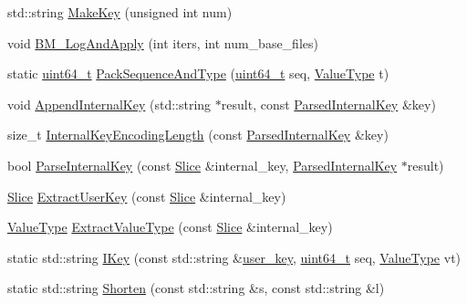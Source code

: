 \begin{DoxyCompactItemize}
std\-::string \hyperlink{namespaceleveldb_a706c78e756ff2dcd2185cdf2265c0b8a}{Make\-Key} (unsigned int num)
\item 
void \hyperlink{namespaceleveldb_af9cf6ec167c9b6f25fd050ab6fb67a90}{B\-M\-\_\-\-Log\-And\-Apply} (int iters, int num\-\_\-base\-\_\-files)
\item 
static \hyperlink{stdint_8h_aaa5d1cd013383c889537491c3cfd9aad}{uint64\-\_\-t} \hyperlink{namespaceleveldb_aefa1c5ac4d405fe1077c19fa2fe68647}{Pack\-Sequence\-And\-Type} (\hyperlink{stdint_8h_aaa5d1cd013383c889537491c3cfd9aad}{uint64\-\_\-t} seq, \hyperlink{namespaceleveldb_acc038cb0d608414730cafa459a4ba866}{Value\-Type} t)
\item 
void \hyperlink{namespaceleveldb_a7192bb79e7fa6ba01490473941386534}{Append\-Internal\-Key} (std\-::string $\ast$result, const \hyperlink{structleveldb_1_1_parsed_internal_key}{Parsed\-Internal\-Key} \&key)
\item 
size\-\_\-t \hyperlink{namespaceleveldb_a8406e76939e7e97465acf293f1585581}{Internal\-Key\-Encoding\-Length} (const \hyperlink{structleveldb_1_1_parsed_internal_key}{Parsed\-Internal\-Key} \&key)
\item 
bool \hyperlink{namespaceleveldb_a5a173b622e86c7a2f9beae3ac8818ac3}{Parse\-Internal\-Key} (const \hyperlink{classleveldb_1_1_slice}{Slice} \&internal\-\_\-key, \hyperlink{structleveldb_1_1_parsed_internal_key}{Parsed\-Internal\-Key} $\ast$result)
\item 
\hyperlink{classleveldb_1_1_slice}{Slice} \hyperlink{namespaceleveldb_a1c889869840312393b805ad91a41b94f}{Extract\-User\-Key} (const \hyperlink{classleveldb_1_1_slice}{Slice} \&internal\-\_\-key)
\item 
\hyperlink{namespaceleveldb_acc038cb0d608414730cafa459a4ba866}{Value\-Type} \hyperlink{namespaceleveldb_a0c5a6ea40d7c0e87060a6e6d3ee393ec}{Extract\-Value\-Type} (const \hyperlink{classleveldb_1_1_slice}{Slice} \&internal\-\_\-key)
\item 
static std\-::string \hyperlink{namespaceleveldb_a129ecd3bf532c7422038a47c86f00826}{I\-Key} (const std\-::string \&\hyperlink{version__set_8cc_afced2118ae0bf03db7c7e75a21cfd004}{user\-\_\-key}, \hyperlink{stdint_8h_aaa5d1cd013383c889537491c3cfd9aad}{uint64\-\_\-t} seq, \hyperlink{namespaceleveldb_acc038cb0d608414730cafa459a4ba866}{Value\-Type} vt)
\item 
static std\-::string \hyperlink{namespaceleveldb_ac7cf47fb2e3de741ca9a5c5d3ecea061}{Shorten} (const std\-::string \&s, const std\-::string \&l)
\item 

\end{DoxyCompactItemize}
